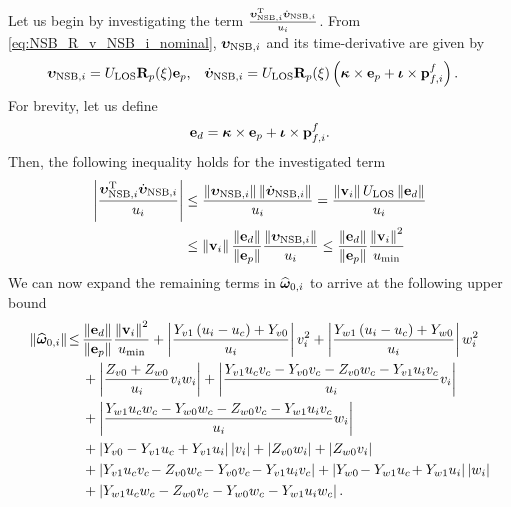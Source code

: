 Let us begin by investigating the term $\frac{\bm{\upsilon}_{{\rm NSB}, i}^{\mathrm{T}}\dot{\bm{\upsilon}}_{{\rm NSB}, i}}{u_i}$.
From \eqref{eq:NSB_R_v_NSB_i_nominal}, $\bm{\upsilon}_{{\rm NSB}, i}$ and its time-derivative are given by
\begin{align}
    \bm{\upsilon}_{{\rm NSB}, i} &= U_{\rm LOS}\mathbf{R}_p(\xi)\mathbf{e}_p, &
    \dot{\bm{\upsilon}}_{{\rm NSB}, i} &= U_{\rm LOS}\mathbf{R}_p(\xi)\left(\bm{\kappa}\times\mathbf{e}_p + \bm{\iota}\times\mathbf{p}_{f,i}^f\right).
\end{align}
For brevity, let us define
\begin{equation}
    \mathbf{e}_d = \bm{\kappa}\times\mathbf{e}_p + \bm{\iota}\times\mathbf{p}_{f,i}^f.
\end{equation}
Then, the following inequality holds for the investigated term
\begin{equation}
\begin{split}
    \left|\frac{\bm{\upsilon}_{{\rm NSB}, i}^{\mathrm{T}}\dot{\bm{\upsilon}}_{{\rm NSB}, i}}{u_i}\right| &\leq
    \frac{\left\|\bm{\upsilon}_{{\rm NSB}, i}\right\|\left\|\dot{\bm{\upsilon}}_{{\rm NSB}, i}\right\|}{u_i} =
    \frac{\left\|\mathbf{v}_i\right\|U_{\rm LOS}\left\|\mathbf{e}_d\right\|}{u_i} \\
    &\leq \left\|\mathbf{v}_i\right\|\frac{\left\|\mathbf{e}_d\right\|}{\left\|\mathbf{e}_p\right\|}\frac{\left\|\bm{\upsilon}_{{\rm NSB}, i}\right\|}{u_i}
    \leq \frac{\left\|\mathbf{e}_d\right\|}{\left\|\mathbf{e}_p\right\|}\frac{\left\|\mathbf{v}_i\right\|^2}{u_{\rm min}}
\end{split}
\end{equation}
We can now expand the remaining terms in $\widehat{\bm{\omega}}_{0, i}$ to arrive at the following upper bound
\begin{equation}
\begin{split}
    \left\|\widehat{\bm{\omega}}_{0, i}\right\|\! \leq\, &
    \frac{\left\|\mathbf{e}_d\right\|}{\left\|\mathbf{e}_p\right\|}\frac{\left\|\mathbf{v}_i\right\|^2}{u_{\rm min}}
    + \left|\frac{Y_{v1}\left(u_i-u_c\right) + Y_{v0}}{u_i}\right|v_i^2
    + \left|\frac{Y_{w1}\left(u_i-u_c\right) + Y_{w0}}{u_i}\right|w_i^2 \\
    &+ \left|\frac{Z_{v0}+Z_{w0}}{u_i}v_iw_i\right| + \left|\frac{Y_{v1}u_cv_c - Y_{v0}v_c - Z_{v0}w_c - Y_{v1}u_iv_c}{u_i}v_i\right| \\
    &+ \left|\frac{Y_{w1}u_cw_c - Y_{w0}w_c - Z_{w0}v_c - Y_{w1}u_iv_c}{u_i}w_i\right| \\
    &+ \left|Y_{v0}-Y_{v1}u_c+Y_{v1}u_i\right|\left|v_i\right| + \left|Z_{v0}w_i\right| + \left|Z_{w0}v_i\right| \\
    &+ \left|Y_{v1}u_cv_{c\!} - Z_{v0}w_{c\!} - Y_{v0}v_{c\!} - Y_{v1}u_iv_c\right| + \left|Y_{w0\!}-Y_{w1}u_{c\!}+Y_{w1}u_i\right|\left|w_i\right| \\
    &+ \left|Y_{w1}u_cw_c - Z_{w0}v_c - Y_{w0}w_c - Y_{w1}u_iw_c\right|.
\end{split}
\end{equation}
